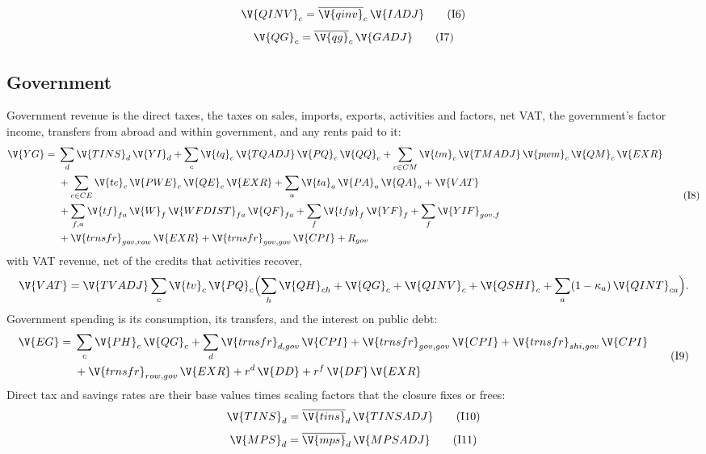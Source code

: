 \begin{equation}
\V{QINV}_c = \overline{\V{qinv}}_c\,\V{IADJ}
\tag{I6}\label{eq:I6}
\end{equation}
\begin{equation}
\V{QG}_c = \overline{\V{qg}}_c\,\V{GADJ}
\tag{I7}\label{eq:I7}
\end{equation}

\subsection{Government}

Government revenue is the direct taxes, the taxes on sales, imports, exports,
activities and factors, net VAT, the government's factor income, transfers
from abroad and within government, and any rents paid to it:
\begin{equation}
\begin{split}
\V{YG} = {}& \sum_d \V{TINS}_d\,\V{YI}_d + \sum_c \V{tq}_c\,\V{TQADJ}\,\V{PQ}_c\,\V{QQ}_c
  + \sum_{c \in CM} \V{tm}_c\,\V{TMADJ}\,\V{pwm}_c\,\V{QM}_c\,\V{EXR}\\
&+ \sum_{c \in CE} \V{te}_c\,\V{PWE}_c\,\V{QE}_c\,\V{EXR} + \sum_a \V{ta}_a\,\V{PA}_a\,\V{QA}_a + \V{VAT}\\
&+ \sum_{f,a} \V{tf}_{fa}\,\V{W}_f\,\V{WFDIST}_{fa}\,\V{QF}_{fa} + \sum_f \V{tfy}_f\,\V{YF}_f
  + \sum_f \V{YIF}_{gov,f}\\
&+ \V{trnsfr}_{gov,row}\,\V{EXR} + \V{trnsfr}_{gov,gov}\,\V{CPI} + R_{gov}
\end{split}
\tag{I8}\label{eq:I8}
\end{equation}
with VAT revenue, net of the credits that activities recover,
\begin{equation*}
\V{VAT} = \V{TVADJ} \sum_c \V{tv}_c\,\V{PQ}_c \Bigl(\sum_h \V{QH}_{ch} + \V{QG}_c + \V{QINV}_c + \V{QSHI}_c
  + \sum_a (1 - \kappa_a)\,\V{QINT}_{ca}\Bigr).
\end{equation*}
Government spending is its consumption, its transfers, and the interest on
public debt:
\begin{equation}
\begin{split}
\V{EG} = {}& \sum_c \V{PH}_c\,\V{QG}_c + \sum_d \V{trnsfr}_{d,gov}\,\V{CPI} + \V{trnsfr}_{gov,gov}\,\V{CPI}
  + \V{trnsfr}_{shi,gov}\,\V{CPI}\\
&+ \V{trnsfr}_{row,gov}\,\V{EXR} + r^d\,\V{DD} + r^f\,\V{DF}\,\V{EXR}
\end{split}
\tag{I9}\label{eq:I9}
\end{equation}
Direct tax and savings rates are their base values times scaling factors that
the closure fixes or frees:
\begin{equation}
\V{TINS}_d = \overline{\V{tins}}_d\,\V{TINSADJ}
\tag{I10}\label{eq:I10}
\end{equation}
\begin{equation}
\V{MPS}_d = \overline{\V{mps}}_d\,\V{MPSADJ}
\tag{I11}\label{eq:I11}
\end{equation}


